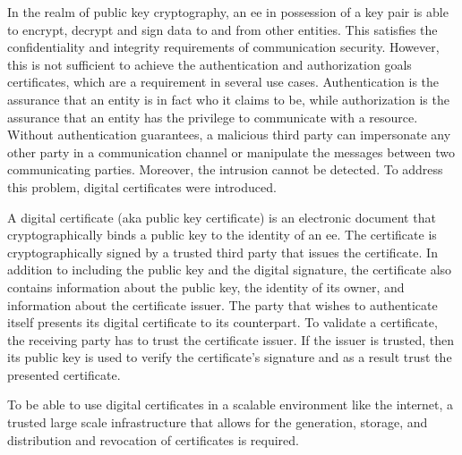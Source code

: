 In the realm of public key cryptography, an \gls{ee} in possession of a key pair is able to encrypt, decrypt and sign data to and from other entities. This satisfies the confidentiality and integrity requirements of communication security. However, this is not sufficient to achieve the authentication and authorization goals
certificates, which are a requirement in several use cases. Authentication is the assurance that an entity is in fact who it claims to be, while authorization is the assurance that an entity has the privilege to communicate with a resource. Without authentication guarantees, a malicious third party can impersonate any other party in a communication channel or manipulate the messages between two communicating parties. Moreover, the intrusion cannot be detected. To address this problem, digital certificates were introduced.
\par
A digital certificate (aka public key certificate) is an electronic document that cryptographically binds a public key to the identity of an \gls{ee}. The certificate is cryptographically signed by a trusted third party that issues the certificate. In addition to including the public key and the digital signature, the certificate also contains information about the public key, the identity of its owner, and information about the certificate issuer. The party that wishes to authenticate itself presents its digital certificate to its counterpart. To validate a certificate, the receiving party has to trust the certificate issuer. If the issuer is trusted, then its public key is used to verify the certificate's signature and as a result trust the presented certificate.
\par
To be able to use digital certificates in a scalable environment like the internet, a trusted large scale infrastructure that allows for the generation, storage, and distribution and revocation of certificates is required.
